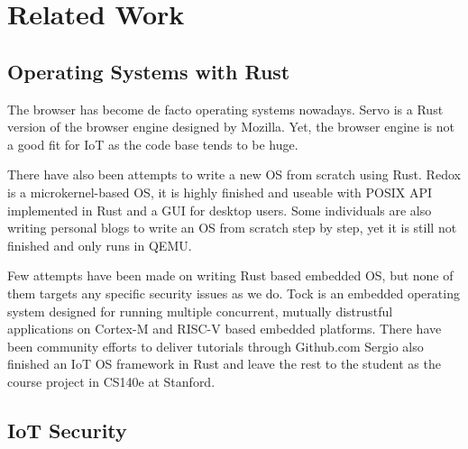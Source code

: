 \section{Related Work}

\subsection{Operating Systems with Rust}

The browser has become de facto operating systems nowadays.
Servo\cite{Servo} is a Rust version of the browser engine designed by Mozilla.
Yet, the browser engine is not a good fit for IoT as the code base tends to be huge.

There have also been attempts to write a new OS from scratch using Rust.
Redox\cite{Redox} is a microkernel-based OS, it is highly finished and useable with POSIX API implemented in Rust and a GUI for desktop users.
Some individuals are also writing personal blogs\cite{OsPhil} to write an OS from scratch step by step, yet it is still not finished and only runs in QEMU. 

Few attempts have been made on writing Rust based embedded OS, but none of them targets any specific security issues as we do.
Tock\cite{levy2015ownership, levy2017tock, levy2017multiprogramming} is an embedded operating system designed for running multiple concurrent, mutually distrustful applications on Cortex-M and RISC-V based embedded platforms.
There have been community efforts to deliver tutorials through Github.com\cite{rpi-os-t0, rpi-os-t1}
Sergio also finished an IoT OS framework in Rust\cite{cs140e} and leave the rest to the student as the course project in CS140e at Stanford.

\subsection{}



\subsection{IoT Security}

